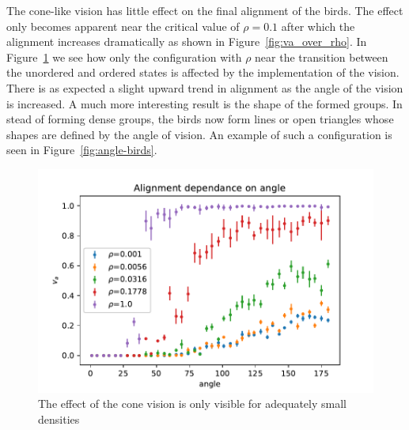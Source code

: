 \documentclass[twoside,twocolumn]{article}
\begin{document}
The cone-like vision has little effect on the final alignment of the birds.
The effect only becomes apparent near the critical value of $\rho=0.1$ after which
the alignment increases dramatically as shown in Figure~\ref{fig:va_over_rho}.
In Figure~\ref{fig:conevision} we see how only the configuration with $\rho$ near the
transition between the unordered and ordered states is affected by the implementation of the vision.
There is as expected a slight upward trend in alignment as the angle of the vision is increased.
A much more interesting result is the shape of the formed groups. In stead of forming
dense groups, the birds now form lines or open triangles whose shapes are defined
by the angle of vision. An example of such a configuration is seen in Figure~\ref{fig:angle-birds}.


\begin{figure}[!htb]
\begin{center}
\includegraphics[width=\columnwidth]{va_over_angle}
\end{center}
\caption{The effect of the cone vision is only visible for adequately small densities}\label{fig:conevision}
\end{figure}
\end{document}

